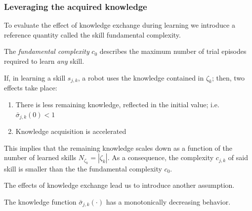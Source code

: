 \subsubsection{\textbf{Leveraging the acquired knowledge}}
To evaluate the effect of knowledge exchange during learning we introduce a reference quantity called the skill fundamental complexity.
\begin{tcolorbox}
	\begin{definition}\label{assumption:fundamental_complexity}
		The \emph{fundamental complexity} $c_0$ describes the maximum number of trial episodes required to learn \emph{any} skill.
	\end{definition}
\end{tcolorbox}
If, in learning a skill $ s_{j,k} $, a robot uses the knowledge contained in $\mathcal{\zeta}_k$; then, two effects take place:
\begin{enumerate}
	\item There is less remaining knowledge, reflected in the initial value; i.e. $\bar{\sigma}_{j,k}(0) < 1$
	\item Knowledge acquisition is accelerated
\end{enumerate}
This implies that the remaining knowledge scales down as a function of the number of learned skills $N_{\zeta_k}=|\mathcal{\zeta}_k|$. As a consequence, the complexity $c_{j,k}$ of said skill is smaller than the the fundamental complexity $c_0$.%

The effects of knowledge exchange lead us to introduce another assumption.
\begin{tcolorbox}
	\begin{assumption}\label{assumption:exponential_decrease} The knowledge function $\bar{\sigma}_{j,k}(\cdot)$ has a monotonically decreasing behavior.
	\end{assumption}
\end{tcolorbox} 
\noindent

